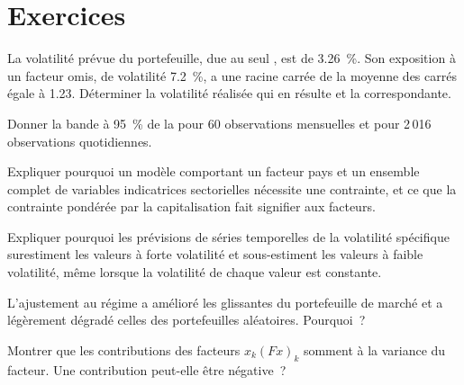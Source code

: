 \section{Exercices}

\begin{exercise}[$\star$]\label{exo:rs:risk-models:1}
La volatilité prévue du portefeuille, due au seul , est de 3.26~\%. Son exposition à un facteur omis, de volatilité 7.2~\%, a une racine carrée de la moyenne des carrés égale à 1.23. Déterminer
la volatilité réalisée qui en résulte et la  correspondante.
\end{exercise}

\begin{exercise}[$\star$]\label{exo:rs:risk-models:2}
Donner la bande à 95~\% de la  pour 60 observations mensuelles et pour 2\,016 observations quotidiennes.
\end{exercise}

\begin{exercise}[$\star$]\label{exo:rs:risk-models:3}
Expliquer pourquoi un modèle comportant un facteur pays et un ensemble complet de variables indicatrices sectorielles nécessite une contrainte, et ce que la contrainte pondérée par la capitalisation fait signifier aux facteurs.
\end{exercise}

\begin{exercise}[$\star\star$]\label{exo:rs:risk-models:4}
Expliquer pourquoi les prévisions de séries temporelles de la volatilité spécifique surestiment les valeurs à forte volatilité et sous-estiment les valeurs à faible volatilité, même
lorsque la volatilité de chaque valeur est constante.
\end{exercise}

\begin{exercise}[$\star\star$]\label{exo:rs:risk-models:5}
L'ajustement au régime a amélioré les  glissantes du portefeuille de marché et a légèrement dégradé celles des portefeuilles aléatoires. Pourquoi~?
\end{exercise}

\begin{exercise}[$\star\star$]\label{exo:rs:risk-models:6}
Montrer que les contributions des facteurs $x_k(Fx)_k$ somment à la variance du facteur. Une contribution peut-elle être négative~?
\end{exercise}

